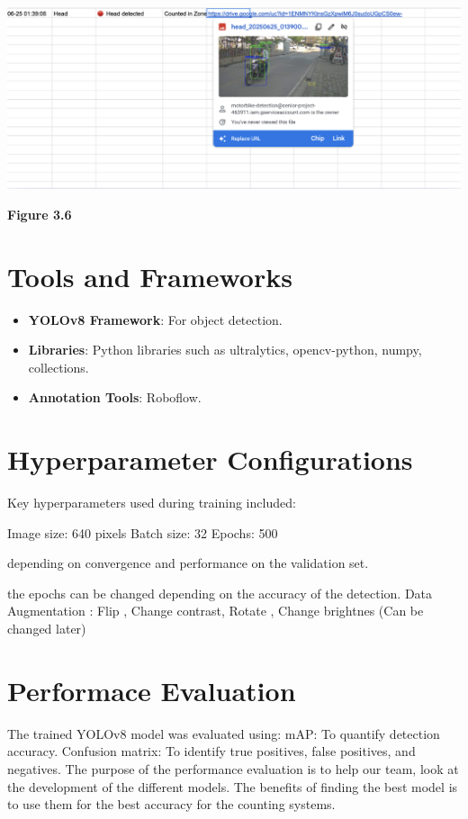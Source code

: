 \begin{center}
	\includegraphics[width=1\textwidth]{api.png}
	
	\vspace{0.5em}
	\textbf{Figure 3.6}
\end{center}

\section{Tools and Frameworks}
\begin{itemize}
	\item \textbf{YOLOv8 Framework}: For object detection.
	\item \textbf{Libraries}: Python libraries such as ultralytics, opencv-python, numpy, collections.
	\item \textbf{Annotation Tools}: Roboflow.
	
\end{itemize}


\section{Hyperparameter Configurations}
Key hyperparameters used during training included:

Image size: 640 pixels
Batch size: 32
Epochs: 500

depending on convergence and performance on the validation set.

the epochs can be changed depending on the accuracy of the detection.
Data  Augmentation : Flip , Change contrast, Rotate , Change brightnes
(Can be changed later)

\section{Performace Evaluation}

The trained YOLOv8 model was evaluated using:
mAP: To quantify detection accuracy.
Confusion matrix: To identify true positives, false positives, and negatives.
The purpose of the performance evaluation is to help our team, look at the development of the different models. The benefits of finding the best model is to use them for the best accuracy for the counting systems.